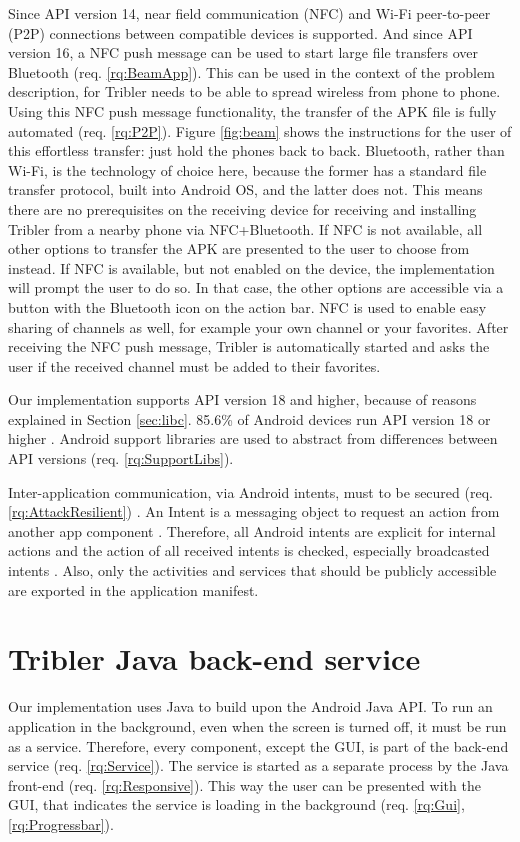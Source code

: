Since API version 14, near field communication (NFC) and Wi-Fi peer-to-peer (P2P) connections between compatible devices is supported.
And since API version 16, a NFC push message can be used to start large file transfers over Bluetooth (req. \ref{rq:BeamApp}).
This can be used in the context of the problem description, for Tribler needs to be able to spread wireless from phone to phone.
Using this NFC push message functionality, the transfer of the APK file is fully automated (req. \ref{rq:P2P}).
Figure \ref{fig:beam} shows the instructions for the user of this effortless transfer: just hold the phones back to back.
Bluetooth, rather than Wi-Fi, is the technology of choice here, because the former has a standard file transfer protocol, built into Android OS, and the latter does not.
This means there are no prerequisites on the receiving device for receiving and installing Tribler from a nearby phone via NFC+Bluetooth.
If NFC is not available, all other options to transfer the APK are presented to the user to choose from instead.
If NFC is available, but not enabled on the device, the implementation will prompt the user to do so.
In that case, the other options are accessible via a button with the Bluetooth icon on the action bar.
NFC is used to enable easy sharing of channels as well, for example your own channel or your favorites.
After receiving the NFC push message, Tribler is automatically started and asks the user if the received channel must be added to their favorites.

Our implementation supports API version 18 and higher, because of reasons explained in Section \ref{sec:libc}.
85.6\% of Android devices run API version 18 or higher \cite{android-dashboard}.
Android support libraries are used to abstract from differences between API versions (req. \ref{rq:SupportLibs}).

Inter-application communication, via Android intents, must to be secured (req. \ref{rq:AttackResilient}) .
An Intent is a messaging object to request an action from another app component \cite{android-intents}.
Therefore, all Android intents are explicit for internal actions and the action of all received intents is checked, especially broadcasted intents \cite{intent-secure}. 
Also, only the activities and services that should be publicly accessible are exported in the application manifest.


\section{Tribler Java back-end service}
Our implementation uses Java to build upon the Android Java API.
To run an application in the background, even when the screen is turned off, it must be run as a service.
Therefore, every component, except the GUI, is part of the back-end service (req. \ref{rq:Service}).
The service is started as a separate process by the Java front-end (req. \ref{rq:Responsive}).
This way the user can be presented with the GUI, that indicates the service is loading in the background (req. \ref{rq:Gui}, \ref{rq:Progressbar}).

